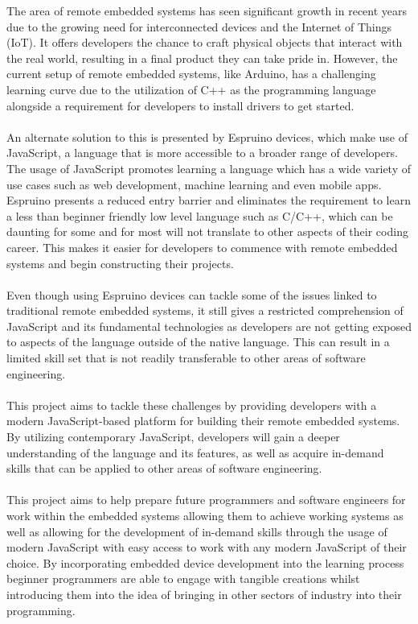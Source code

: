 \documentclass{l4proj}
\begin{document}
\text 
The area of remote embedded systems has seen significant growth in recent years due to the growing need for interconnected devices and the Internet of Things (IoT). It offers developers the chance to craft physical objects that interact with the real world, resulting in a final product they can take pride in. However, the current setup of remote embedded systems, like Arduino, has a challenging learning curve due to the utilization of C++ as the programming language alongside a requirement for developers to install drivers to get started.
\\ \\
An alternate solution to this is presented by Espruino devices, which make use of JavaScript, a language that is more accessible to a broader range of developers. The usage of JavaScript promotes learning a language which has a wide variety of use cases such as web development, machine learning and even mobile apps. Espruino presents a reduced entry barrier and eliminates the requirement to learn a less than beginner friendly low level language such as C/C++, which can be daunting for some and for most will not translate to other aspects of their coding career. This makes it easier for developers to commence with remote embedded systems and begin constructing their projects.
\\ \\
Even though using Espruino devices can tackle some of the issues linked to traditional remote embedded systems, it still gives a restricted comprehension of JavaScript and its fundamental technologies as developers are not getting exposed to aspects of the language outside of the native language. This can result in a limited skill set that is not readily transferable to other areas of software engineering.
\\ \\
This project aims to tackle these challenges by providing developers with a modern JavaScript-based platform for building their remote embedded systems. By utilizing contemporary JavaScript, developers will gain a deeper understanding of the language and its features, as well as acquire in-demand skills that can be applied to other areas of software engineering.
\\ \\
This project aims to help prepare future programmers and software engineers for work within the embedded systems allowing them to achieve working systems as well as allowing for the development of in-demand skills through the usage of modern JavaScript with easy access to work with any modern JavaScript of their choice. By incorporating embedded device development into the learning process beginner programmers are able to engage with tangible creations whilst introducing them into the idea of bringing in other sectors of industry into their programming.
\end{document}
